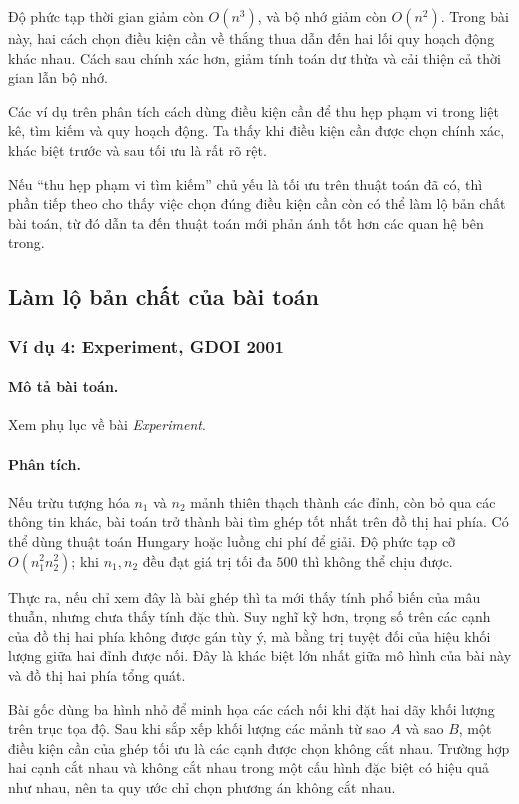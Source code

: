 \documentclass[11pt]{article}
\begin{document}
Độ phức tạp thời gian giảm còn $O(n^3)$, và bộ nhớ giảm còn $O(n^2)$. Trong
bài này, hai cách chọn điều kiện cần về thắng thua dẫn đến hai lối quy hoạch
động khác nhau. Cách sau chính xác hơn, giảm tính toán dư thừa và cải thiện
cả thời gian lẫn bộ nhớ.

Các ví dụ trên phân tích cách dùng điều kiện cần để thu hẹp phạm vi trong
liệt kê, tìm kiếm và quy hoạch động. Ta thấy khi điều kiện cần được chọn
chính xác, khác biệt trước và sau tối ưu là rất rõ rệt.

Nếu ``thu hẹp phạm vi tìm kiếm'' chủ yếu là tối ưu trên thuật toán đã có, thì
phần tiếp theo cho thấy việc chọn đúng điều kiện cần còn có thể làm lộ bản
chất bài toán, từ đó dẫn ta đến thuật toán mới phản ánh tốt hơn các quan hệ
bên trong.

\subsection{Làm lộ bản chất của bài toán}

\subsubsection*{Ví dụ 4: Experiment, GDOI 2001}

\paragraph{Mô tả bài toán.}
Xem phụ lục về bài \emph{Experiment}.

\paragraph{Phân tích.}
Nếu trừu tượng hóa $n_1$ và $n_2$ mảnh thiên thạch thành các đỉnh, còn bỏ qua
các thông tin khác, bài toán trở thành bài tìm ghép tốt nhất trên đồ thị hai
phía. Có thể dùng thuật toán Hungary hoặc luồng chi phí để giải. Độ phức tạp
cỡ $O(n_1^2n_2^2)$; khi $n_1,n_2$ đều đạt giá trị tối đa $500$ thì không thể
chịu được.

Thực ra, nếu chỉ xem đây là bài ghép thì ta mới thấy tính phổ biến của mâu
thuẫn, nhưng chưa thấy tính đặc thù. Suy nghĩ kỹ hơn, trọng số trên các cạnh
của đồ thị hai phía không được gán tùy ý, mà bằng trị tuyệt đối của hiệu khối
lượng giữa hai đỉnh được nối. Đây là khác biệt lớn nhất giữa mô hình của bài
này và đồ thị hai phía tổng quát.

Bài gốc dùng ba hình nhỏ để minh họa các cách nối khi đặt hai dãy khối lượng
trên trục tọa độ. Sau khi sắp xếp khối lượng các mảnh từ sao $A$ và sao $B$,
một điều kiện cần của ghép tối ưu là các cạnh được chọn không cắt nhau. Trường
hợp hai cạnh cắt nhau và không cắt nhau trong một cấu hình đặc biệt có hiệu
quả như nhau, nên ta quy ước chỉ chọn phương án không cắt nhau.
\end{document}
